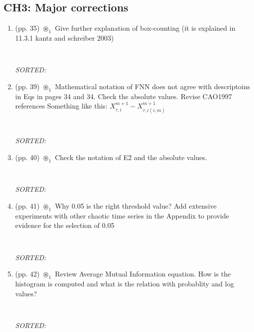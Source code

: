 \documentclass[12pt]{article}
\begin{document}
\subsection{CH3: Major corrections}
\begin{enumerate}

\item  (pp. 35) $\circledast_1$ 
	Give further explanation of box-counting
	(it is explained in 11.3.1 kantz and schreiber 2003)
	\begin{verbatim}
	
	\end{verbatim}
	\textit{
	SORTED:  
	}
	\\

\item  (pp. 39) $\circledast_1$ 
	Mathematical notation of FNN
	does not agree with descriptoins 
	in Eqs in pages 34 and 34.
	Check the absolute values.
	Revise CAO1997 references
	Something like this:
	$X_{\tau, i}^{m+1} - X_{\tau, i(i,m)}^{m+1}  $

	\begin{verbatim}
	
	\end{verbatim}
	\textit{
	SORTED:  
	}
	\\

\item  (pp. 40) $\circledast_1$ 
	Check the notation of E2 and the absolute values.
	
	\begin{verbatim}
	
	\end{verbatim}
	\textit{
	SORTED:  
	}
	\\

\item  (pp. 41) $\circledast_1$ 
	Why 0.05 is the right threshold value?
	Add extensive experiments with other chaotic
	time series in the Appendix to provide
	evidence for the selection of 0.05
	\begin{verbatim}
	
	\end{verbatim}
	\textit{
	SORTED:  
	}
	\\


\item  (pp. 42) $\circledast_1$ 
	Review Average Mutual Information equation.
	How is the histogram is computed and what
	is the relation with probablity and log values?
	\begin{verbatim}
	
	\end{verbatim}
	\textit{
	SORTED:  
	}
	\\



\end{enumerate}
\end{document}
